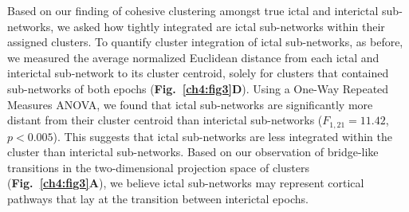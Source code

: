 Based on our finding of cohesive clustering amongst true ictal and interictal sub-networks, we asked how tightly integrated are ictal sub-networks within their assigned clusters. To quantify cluster integration of ictal sub-networks, as before, we measured the average normalized Euclidean distance from each ictal and interictal sub-network to its cluster centroid, solely for clusters that contained sub-networks of both epochs (\textbf{Fig.~\ref{ch4:fig3}D}). Using a One-Way Repeated Measures ANOVA, we found that ictal sub-networks are significantly more distant from their cluster centroid than interictal sub-networks ($F_{1,21}=11.42$, $p<0.005$). This suggests that ictal sub-networks are less integrated within the cluster than interictal sub-networks. Based on our observation of bridge-like transitions in the two-dimensional projection space of clusters (\textbf{Fig.~\ref{ch4:fig3}A}), we believe ictal sub-networks may represent cortical pathways that lay at the transition between interictal epochs. 

